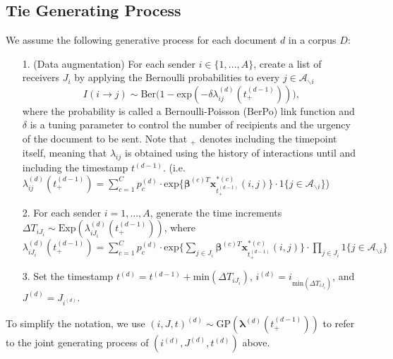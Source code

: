 \documentclass[a4paper]{article}
\begin{document}
\subsection{Tie Generating Process}\label{subsec: Tie Generating Process}
We assume the following generative process for each document $d$ in a corpus $D$:
\begin{itemize}
	\item[1.] (Data augmentation) For each sender $i \in \{1,...,A\}$, create a list of receivers $J_i$ by applying the Bernoulli probabilities to every $j \in \mathcal{A}_{\backslash i}$
	\begin{equation} I(i \rightarrow j) \sim \mbox{Ber}\Big(1-\mbox{exp}(-\delta\lambda^{(d)}_{ij}(t_+^{(d-1)}))\Big),
	\end{equation}
	where the probability is called a Bernoulli-Poisson (BerPo) link function \citep{zhou2015infinite} and $\delta$ is a tuning parameter to control the number of recipients and the urgency of the document to be sent. Note that $_+$ denotes including the timepoint itself, meaning that $\lambda_{ij}$ is obtained using the history of interactions until and including the timestamp $t^{(d-1)}$. (i.e. $\lambda^{(d)}_{ij}(t_+^{(d-1)})=\sum\limits_{c=1}^{C} p^{(d)}_c\cdot\mbox{exp}\Big\{\boldsymbol{\beta}^{(c)T}\boldsymbol{x}^{*(c)}_{t^{(d-1)}_+}(i, j)\Big\}\cdot 1\{j \in \mathcal{A}_{\backslash i}\}$)
	\item[2.] For each sender $i = 1,...,A$, generate the time increments $\Delta T_{i{J_i}} \sim \mbox{Exp}(\lambda_{i{J_i}}^{(d)}(t_+^{(d-1)}))$, where $\lambda^{(d)}_{i{J_i}}(t_+^{(d-1)})= \sum\limits_{c=1}^{C} p^{(d)}_c\cdot\mbox{exp}\Big\{\sum\limits_{j \in{J_i}}\boldsymbol{\beta}^{(c)T}\boldsymbol{x}^{*(c)}_{t^{(d-1)}_+}(i, j)\Big\}\cdot \prod\limits_{j \in J_i}1\{j \in \mathcal{A}_{\backslash i}\}$
	 \item[3.] Set the timestamp $t^{(d)} = t^{(d-1)}+\mbox{min}(\Delta T_{i{J_i}})$, $i^{(d)} = i_{\mbox{min}(\Delta T_{i{J_i}})}$, and $J^{(d)} = J_{i^{(d)}}$.
\end{itemize}
To simplify the notation, we use $(i, J, t)^{(d)} \sim \mbox{GP}(\boldsymbol{\lambda}^{(d)}(t_+^{(d-1)}))$ to refer to the joint generating process of $(i^{(d)}, J^{(d)}, t^{(d)})$ above.
\end{document}

